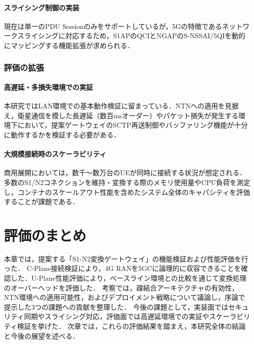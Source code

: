 \paragraph{スライシング制御の実装}
現在は単一のPDU Sessionのみをサポートしているが，5Gの特徴であるネットワークスライシングに対応するため，S1APのQCIとNGAPのS-NSSAI/5QIを動的にマッピングする機能拡張が求められる．

\subsubsection{評価の拡張}
\paragraph{高遅延・多損失環境での実証}
本研究ではLAN環境での基本動作検証に留まっている．NTNへの適用を見据え，衛星通信を模した長遅延（数百msオーダー）やパケット損失が発生する環境下において，提案ゲートウェイのSCTP再送制御やバッファリング機能が十分に動作するかを検証する必要がある．

\paragraph{大規模接続時のスケーラビリティ}
商用展開においては，数千〜数万台のUEが同時に接続する状況が想定される．多数のS1/N2コネクションを維持・変換する際のメモリ使用量やCPU負荷を測定し，コンテナのスケールアウト性能を含めたシステム全体のキャパシティを評価することが課題である．

\section{評価のまとめ}
本章では，提案する「S1-N2変換ゲートウェイ」の機能検証および性能評価を行った．
C-Plane接続検証により，4G RANを5GCに論理的に収容できることを確認した．U-Plane性能評価により，ベースライン環境との比較を通じて変換処理のオーバーヘッドを評価した．
考察では，疎結合アーキテクチャの有効性，NTN環境への適用可能性，およびデプロイメント戦略について議論し，序論で提示した3つの課題への貢献を整理した．
今後の課題として，実装面ではセキュリティ同期やスライシング対応，評価面では高遅延環境での実証やスケーラビリティ検証を挙げた．
次章では，これらの評価結果を踏まえ，本研究全体の結論と今後の展望を述べる．
